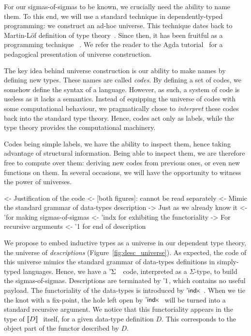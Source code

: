 For our sigmas-of-sigmas to be known, we crucially need the ability to
name them. 
To this end, we will use a standard technique in dependently-typed
programming: we construct an ad-hoc universe. This technique dates
back to Martin-L\"of definition of type
theory~\cite{martin-lof:itt}. Since then, it has been fruitful as a
programming technique~\cite{benke:universe-generic-prog, whoelse?}
. We refer the reader to the Agda
tutorial~\cite{norell:agda-tutorial} for a pedagogical presentation of
universe construction. 


The key idea behind universe construction is our ability to make names
by defining new types. These names are called \emph{codes}. By
defining a set of codes, we somehow define the syntax of a
language. However, as such, a system of code is useless as it lacks a
semantics. Instead of equipping the universe of codes with some
computational behaviour, we pragmatically chose to \emph{interpret}
these codes back into the standard type theory. Hence, codes act only
as labels, while the type theory provides the computational
machinery. 

Codes being simple labels, we have the ability to inspect them, hence
taking advantage of structural information. Being able to inspect
them, we are therefore free to compute over them: deriving new codes
from previous ones, or even new functions on them. In several
occasions, we will have the opportunity to witness the power of
universes.

\begin{wstructure}
<- Justification of the code 
    <- [both figures]: cannot be read separately
    <- Mimic the standard grammar of data-types description
        -> Just as we already know it
        <- '\Sigma for making sigmas-of-sigmas
        <- 'indx for exhibiting the functoriality
            -> For recursive arguments
        <- '1 for end of description
\end{wstructure}

We propose to embed inductive types as a universe in our dependent
type theory, the universe of \emph{descriptions}
(Figure~\ref{fig:desc_universe}). As expected, the code of this
universe mimics the standard grammar of data-types definitions in
simply-typed languages. Hence, we have a $\DSigma{}{}$ code,
interpreted as a $\Sigma$-type, to build the
sigmas-of-sigmas. Descriptions are terminated by $\DUnit$, which
contains no useful payload. The functoriality of the data-types is
introduced by $\DIndx$. When we tie the knot with a fix-point, the
hole left open by $\DIndx$ will be turned into a standard recursive
argument. We notice that this functoriality appears in the type of
$\descop{D}{}$ itself, for a given data-type definition $D$. This
corresponds to the object part of the functor described by $D$.

